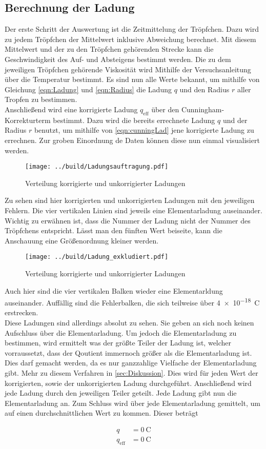 \subsection{Berechnung der Ladung}
Der erste Schritt der Auswertung ist die Zeitmittelung der Tröpfchen. Dazu wird zu jedem Tröpfchen der Mittelwert inklusive Abweichung berechnet. Mit diesem Mittelwert und der 
zu den Tröpfchen gehörenden Strecke kann die Geschwindigkeit des Auf- und Absteigens bestimmt werden.
Die zu dem jeweiligen Tröpfchen gehörende Viskosität wird Mithilfe der Versuchsanleitung über die Temperatur bestimmt. 
Es sind nun alle Werte bekannt, um mithilfe von Gleichung \eqref{eqn:Ladung} und \eqref{eqn:Radius} die Ladung $q$ und den Radius $r$ aller Tropfen zu 
bestimmen. \\
\noindent Anschließend wird eine korrigierte Ladung $q_\text{eff}$ über den Cunningham-Korrekturterm bestimmt. 
Dazu wird die bereits errechnete Ladung $q$ und der Radius $r$ benutzt, um mithilfe von \eqref{eqn:cunningLad} jene korrigierte Ladung zu errechnen.
Zur groben Einordnung de Daten können diese nun einmal visualisiert werden.

\begin{figure}
    \centering
    \texttt{[image: ../build/Ladungsauftragung.pdf]}
    \caption{Verteilung korrigierte und unkorrigierter Ladungen}
    \label{fig:Ladungsverteilung}
\end{figure}

\noindent Zu sehen sind hier korrigierten und unkorrigierten Ladungen mit den jeweiligen Fehlern. Die vier vertikalen Linien sind jeweils eine 
Elementarladung auseinander. Wichtig zu erwähnen ist, dass die Nummer der Ladung nicht der Nummer des Tröpfchens entspricht.
Lässt man den fünften Wert beiseite, kann die Anschauung eine Größenordnung kleiner werden. 

\begin{figure*}
    \centering
    \texttt{[image: ../build/Ladung\_exkludiert.pdf]}
    \caption{Verteilung korrigierte und unkorrigierter Ladungen}
\end{figure*}

\noindent Auch hier sind die vier vertikalen Balken wieder eine Elementarldung auseinander.
Auffällig sind die Fehlerbalken, die sich teilweise über \qty{4e-18}{\coulomb} erstrecken. \\
\noindent Diese Ladungen sind allerdings absolut zu sehen. Sie geben an sich noch keinen Aufschluss über die Elementarladung.
Um jedoch die Elementarladung zu bestimmen, wird ermittelt was der größte Teiler der Ladung ist, welcher vorraussetzt, dass der Qoutient 
immernoch größer als die Elementarladung ist. Dies darf gemacht werden, da es nur ganzzahlige Vielfache der Elementarladung gibt. 
Mehr zu diesem Verfahren in \autoref{sec:Diskussion}. 
Dies wird für jeden Wert der korrigierten, sowie der unkorrigierten Ladung durchgeführt. 
Anschließend wird jede Ladung durch den jeweiligen Teiler geteilt. Jede Ladung gibt nun die Elementarladung an.
Zum Schluss wird über jede Elementarladung gemittelt, um auf einen durchschnittlichen Wert zu kommen.
Dieser beträgt 

\begin{align*}
    q            &= \qty{0}{\coulomb} \\
    q_\text{eff} &= \qty{0}{\coulomb} 
\end{align*}




